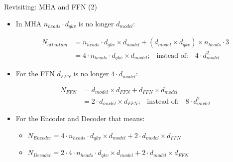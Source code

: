 \documentclass[11pt,compress,t,notes=noshow, xcolor=table]{beamer}
\begin{document}

\begin{frame}{Revisiting: MHA and FFN (2)}

\begin{itemize}
    \item In MHA $n_{heads} \cdot d_{qkv}$ is no longer $d_{model}$:
		
					\begin{align*}
					N_{attention} &= n_{heads} \cdot d_{qkv} \times d_{model} + (d_{model} \times d_{qkv}) \times n_{heads} \cdot 3 \\
					&= 4\cdot n_{heads}\cdot d_{qkv} \times d_{model}\text{;}\quad \text{instead of:}\quad 4\cdot d_{model}^2
					\end{align*}
    
    \item For the FFN $d_{FFN}$ is no longer $4\cdot d_{model}$:

					\begin{align*}
					N_{FFN} &= d_{model} \times d_{FFN} + d_{FFN} \times d_{model} \\
					&= 2\cdot d_{model} \times d_{FFN}\text{;}\quad \text{instead of:}\quad 8\cdot d_{model}^2
					\end{align*}

    \item For the Encoder and Decoder that means:
    \begin{itemize}
        \item $N_{Encoder} = 4\cdot n_{heads}\cdot d_{qkv} \times d_{model} + 2\cdot d_{model} \times d_{FFN}$
        \item $N_{Decoder} = 2\cdot 4\cdot n_{heads}\cdot d_{qkv} \times d_{model} + 2\cdot d_{model} \times d_{FFN} $
    \end{itemize}

\end{itemize}
    
\end{frame}

\end{document}
